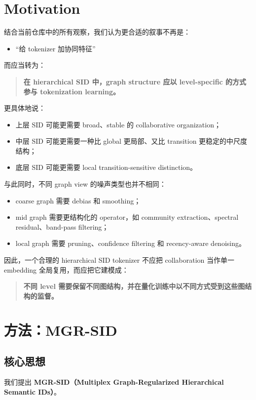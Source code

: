 \documentclass[11pt]{article}
\begin{document}
\section{Motivation}

结合当前仓库中的所有观察，我们认为更合适的叙事不再是：
\begin{itemize}
  \item ``给 tokenizer 加协同特征''
\end{itemize}
而应当转为：
\begin{quote}
\textbf{在 hierarchical SID 中，graph structure 应以 level-specific 的方式参与 tokenization learning。}
\end{quote}

更具体地说：
\begin{itemize}
  \item 上层 SID 可能更需要 broad、stable 的 collaborative organization；
  \item 中层 SID 可能更需要一种比 global 更局部、又比 transition 更稳定的中尺度结构；
  \item 底层 SID 可能更需要 local transition-sensitive distinction。
\end{itemize}

与此同时，不同 graph view 的噪声类型也并不相同：
\begin{itemize}
  \item coarse graph 需要 debias 和 smoothing；
  \item mid graph 需要更结构化的 operator，如 community extraction、spectral residual、band-pass filtering；
  \item local graph 需要 pruning、confidence filtering 和 recency-aware denoising。
\end{itemize}

因此，一个合理的 hierarchical SID tokenizer 不应把 collaboration 当作单一 embedding 全局复用，而应把它建模成：
\begin{quote}
\textbf{不同 level 需要保留不同图结构，并在量化训练中以不同方式受到这些图结构的监督。}
\end{quote}

\section{方法：MGR-SID}

\subsection{核心思想}

我们提出 \textbf{MGR-SID（Multiplex Graph-Regularized Hierarchical Semantic IDs）}。
\end{document}
